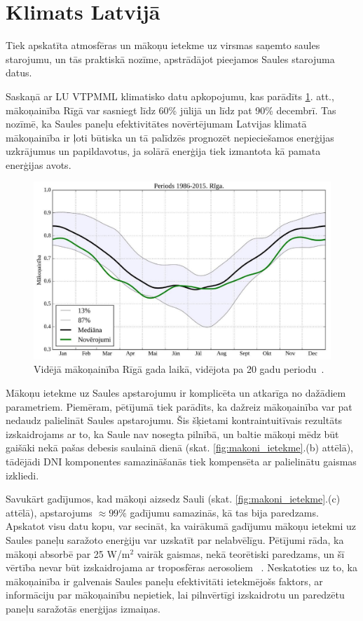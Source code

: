 \section{Klimats Latvijā}

Tiek apskatīta atmosfēras un mākoņu ietekme uz virsmas saņemto saules starojumu, un tās praktiskā nozīme, apstrādājot pieejamos Saules starojuma datus.

Saskaņā ar LU VTPMML klimatisko datu apkopojumu, kas parādīts \ref{fig:makoni_Riga}. att., mākoņainība Rīgā var sasniegt līdz 60\% jūlijā un līdz pat 90\% decembrī. Tas nozīmē, ka Saules paneļu efektivitātes novērtējumam Latvijas klimatā mākoņainība ir ļoti būtiska un tā palīdzēs prognozēt nepieciešamos enerģijas uzkrājumus un papildavotus, ja solārā enerģija tiek izmantota kā pamata enerģijas avots.
\begin{figure}[h]
	\centering
	\includegraphics[width=0.8\linewidth]{figures/misc/makoni_riga.jpg}
	\caption{Vidējā mākoņainība Rīgā gada laikā, vidējota pa 20 gadu periodu~\cite{cloudsModlab}.}
	\label{fig:makoni_Riga}
\end{figure}

Mākoņu ietekme uz Saules apstarojumu ir komplicēta un atkarīga no dažādiem parametriem. Piemēram, pētījumā \cite{CloudCoverageImpactOnIrradiance} tiek parādīts, ka dažreiz mākoņainība var pat nedaudz palielināt Saules apstarojumu. Šis šķietami kontraintuitīvais rezultāts izskaidrojams ar to, ka Saule nav nosegta pilnībā, un baltie mākoņi mēdz būt gaišāki nekā pašas debesis saulainā dienā (skat. \ref{fig:makoni_ietekme}.(b) attēlā), tādējādi DNI komponentes samazināšanās tiek kompensēta ar palielinātu gaismas izkliedi. 

Savukārt gadījumos, kad mākoņi aizsedz Sauli (skat. \ref{fig:makoni_ietekme}.(c) attēlā), apstarojums $\approx99\%$ gadījumu samazinās, kā tas bija paredzams.
Apskatot visu datu kopu, var secināt, ka vairākumā gadījumu mākoņu ietekmi uz Saules paneļu saražoto enerģiju var uzskatīt par nelabvēlīgu.
Pētījumi rāda, ka mākoņi absorbē par 25 W/m$^2$ vairāk gaismas, nekā teorētiski paredzams, un šī vērtība nevar būt izskaidrojama ar troposfēras aerosoliem ~\cite{observVSModel}. Neskatoties uz to, ka mākoņainība ir galvenais Saules paneļu efektivitāti ietekmējošs faktors, ar informāciju par mākoņainību nepietiek, lai pilnvērtīgi izskaidrotu un paredzētu paneļu saražotās enerģijas izmaiņas.

